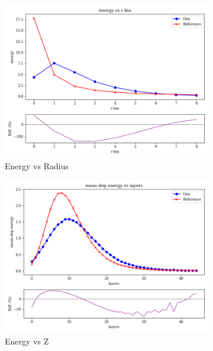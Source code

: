 \begin{figure}[htbp]
    \centering
    \begin{subfigure}[b]{0.23\textwidth}
        \centering
        \includegraphics[width=\textwidth]{Figures/2_2.png}
        \caption{Energy vs Radius}
        \label{fig:a2_2}
    \end{subfigure}
    \hfill
    \begin{subfigure}[b]{0.23\textwidth}
        \centering
        \includegraphics[width=\textwidth]{Figures/2_3.png}
        \caption{Energy vs Z}
        \label{fig:a2_3}
    \end{subfigure}
    \hfill
    \begin{subfigure}[b]{0.23\textwidth}

\end{subfigure}
\end{figure}
